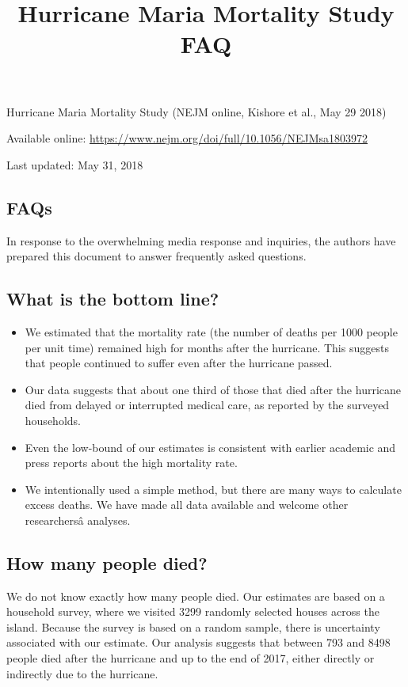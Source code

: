 \documentclass[]{article}
\title{Hurricane Maria Mortality Study FAQ}
\author{}
\date{}
\providecommand{\tightlist}{%
  \setlength{\itemsep}{0pt}\setlength{\parskip}{0pt}}
\begin{document}
\maketitle

Hurricane Maria Mortality Study (NEJM online, Kishore et al., May 29
2018)

Available online:
\url{https://www.nejm.org/doi/full/10.1056/NEJMsa1803972}

Last updated: May 31, 2018

\subsection{FAQs}\label{faqs}

In response to the overwhelming media response and inquiries, the
authors have prepared this document to answer frequently asked
questions.

\subsection{What is the bottom line?}\label{what-is-the-bottom-line}

\begin{itemize}
\tightlist
\item
  We estimated that the mortality rate (the number of deaths per 1000
  people per unit time) remained high for months after the hurricane.
  This suggests that people continued to suffer even after the hurricane
  passed.
\item
  Our data suggests that about one third of those that died after the
  hurricane died from delayed or interrupted medical care, as reported
  by the surveyed households.
\item
  Even the low-bound of our estimates is consistent with earlier
  academic and press reports about the high mortality rate.
\item
  We intentionally used a simple method, but there are many ways to
  calculate excess deaths. We have made all data available and welcome
  other researchersâ analyses.
\end{itemize}

\subsection{How many people died?}\label{how-many-people-died}

We do not know exactly how many people died. Our estimates are based on
a household survey, where we visited 3299 randomly selected houses
across the island. Because the survey is based on a random sample, there
is uncertainty associated with our estimate. Our analysis suggests that
between 793 and 8498 people died after the hurricane and up to the end
of 2017, either directly or indirectly due to the hurricane.
\end{document}
